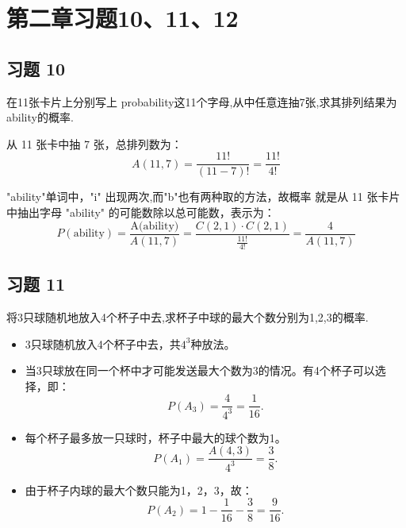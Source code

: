\documentclass[twoside]{article}
\begin{document}
\maketitle
\vspace{-3.5em}

\tableofcontents

\section{第二章习题10、11、12}

\subsection{习题 10}

在11张卡片上分别写上 probability这11个字母,从中任意连抽7张,求其排列结果为ability的概率.

\begin{ans}{1}{1}
从 11 张卡中抽 7 张，总排列数为：
\[
A(11, 7) = \frac{11!}{(11 - 7)!} = \frac{11!}{4!}
\]

"ability"单词中，"i" 出现两次,而"b"也有两种取的方法，故概率
就是从 11 张卡片中抽出字母 "ability" 的可能数除以总可能数，表示为：
\[
P(\text{ability}) = \frac{\text{A(ability)}}{A(11, 7)} = \frac{C(2,1)·C(2,1)}{\frac{11!}{4!}} = \frac{4}{A(11,7)}
\]

\end{ans}

\subsection{习题 11}
将3只球随机地放入4个杯子中去,求杯子中球的最大个数分别为1,2,3的概率.
\begin{ans}{2}{2}
    \begin{itemize}
    \item 3只球随机放入4个杯子中去，共$4^3$种放法。

    \item 当3只球放在同一个杯中才可能发送最大个数为3的情况。有4个杯子可以选择，即：\\
    \[
        P(A_3) = \frac{4}{4^3} = \frac{1}{16}.
    \]

    \item 每个杯子最多放一只球时，杯子中最大的球个数为1。
    \[
        P(A_1) = \frac{A(4,3)}{4^3} = \frac{3}{8}.
    \]
    \item 由于杯子内球的最大个数只能为1，2，3，故：
    \[
        P(A_2) = 1 - \frac{1}{16} - \frac{3}{8} = \frac{9}{16}.
    \]
    \end{itemize}
\end{ans}
\end{document}
